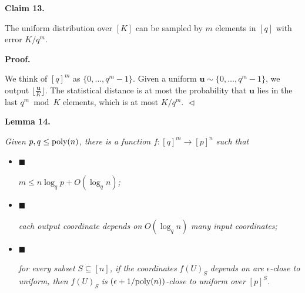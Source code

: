 

\par\medskip\noindent\textbf{
Claim 13. 
}\par



The uniform distribution over $[K]$ can be sampled by $m$ elements in $[q]$ with error $K/q^{m}$.\par






\par\medskip\noindent\textbf{
\textbf{Proof}.}\par




We think of $[q]^{m}$ as $\{0,\ldots,q^{m}-1\}$.
Given a uniform $\boldsymbol{u}\sim\{0,\ldots,q^{m}-1\}$, we output $\lfloor\frac{\boldsymbol{u}}{K}\rfloor$.
The statistical distance is at most the probability that $\boldsymbol{u}$ lies in the last $q^{m}\bmod K$ elements, which is at most $K/q^{m}$.
$\vartriangleleft$\par





\par\medskip\noindent\textbf{
\textbf{Lemma 14}\textbf{.}
}\par



\emph{Given $p,q\leq\textnormal{poly}(n)$, there is a function $f\colon[q]^{m}\to[p]^{n}$ such that}\par


\begin{itemize}


\item[] 
$\blacksquare$ 


$m\leq n\log_{q}p+O(\log_{q}n)$\emph{;}\par





\item[] 
$\blacksquare$ 


\emph{each output coordinate depends on }$O(\log_{q}n)$\emph{ many input coordinates;}\par





\item[] 
$\blacksquare$ 


\emph{for every subset }$S\subseteq[n]$\emph{, if the coordinates }$f(U)_{S}$\emph{ depends on are }$\epsilon$\emph{-close to uniform, then }$f(U)_{S}$\emph{ is }$(\epsilon+1/\textnormal{poly}(n))$\emph{-close to uniform over }$[p]^{S}$\emph{.}\par





\end{itemize}



